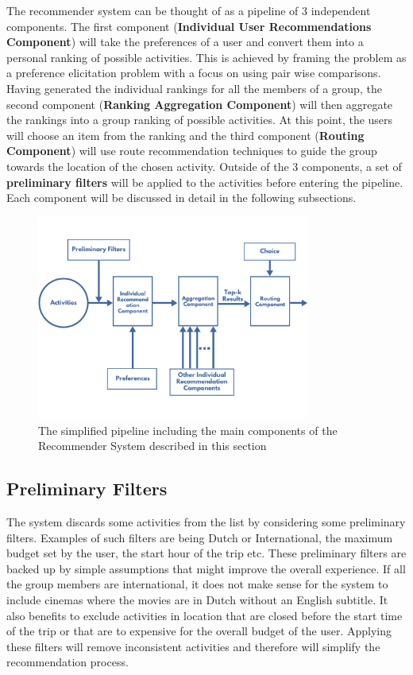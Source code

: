 \documentclass[11pt,a4paper,oneside]{article}
\begin{document}
The recommender system can be thought of as a pipeline of 3 independent components. The first component (\textbf{Individual User Recommendations Component}) will take the preferences of a user and convert them into a personal ranking of possible activities. This is achieved by framing the problem as a preference elicitation problem with a focus on using pair wise comparisons. Having generated the individual rankings for all the members of a group, the second component (\textbf{Ranking Aggregation Component}) will then aggregate the rankings into a group ranking of possible activities. At this point, the users will choose an item from the ranking and the third component (\textbf{Routing Component}) will use route recommendation techniques to guide the group towards the location of the chosen activity. Outside of the 3 components, a set of \textbf{preliminary filters} will be applied to the activities before entering the pipeline. Each component will be discussed in detail in the following subsections.

\begin{figure}[H]
    \centering
    \includegraphics[width=0.8\textwidth]{paper/imgs/chart_ais.png}
    \caption{The simplified pipeline including the main components of the Recommender System described in this section}
    \label{fig:pipeline}
\end{figure}

\subsection{Preliminary Filters}
The system discards some activities from the list by considering some preliminary filters. Examples of such filters are being Dutch or International, the maximum budget set by the user, the start hour of the trip etc. These preliminary filters are backed up by simple assumptions that might improve the overall experience. If all the group members are international, it does not make sense for the system to include cinemas where the movies are in Dutch without an English subtitle. It also benefits to exclude activities in location that are closed before the start time of the trip or that are to expensive for the overall budget of the user. Applying these filters will remove inconsistent activities and therefore will simplify the recommendation process.
\end{document}
